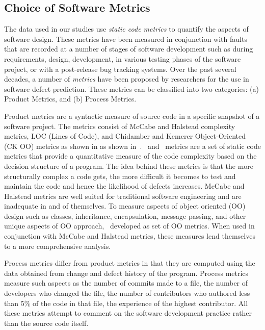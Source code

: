 \subsection{Choice of Software Metrics}
\label{sect:metrics}

The data used in our studies use \textit{static code metrics} to quantify the aspects of software design. These metrics have been measured in conjunction with faults that are recorded at a number of stages of software development such as during requirements, design, development, in various testing phases of the software project, or with a post-release bug tracking systems. Over the past several decades, a number of \textit{metrics} have been proposed by researchers for the use in software defect prediction. These metrics can be classified into two  categories: (a) Product Metrics, and (b) Process Metrics.

Product metrics are a syntactic measure of source code in a specific snapshot of a software project. The metrics consist of McCabe and Halstead complexity metrics, LOC (Lines of Code), and Chidamber and Kemerer Object-Oriented (CK OO) metrics as shown in as shown in~.~\cite{mccabe1976complexity} and~\cite{halstead77} metrics are a set of static code metrics that provide a quantitative measure of the code complexity based on the decision structure of a program. The idea behind these metrics is that the more structurally complex a code gets, the more difficult it becomes to test and maintain the code and hence the likelihood of defects increases. McCabe and Halstead metrics are well suited for traditional software engineering and are inadequate in and of themselves. To measure aspects of object oriented (OO) design such as classes, inheritance, encapsulation, message passing, and other unique aspects of OO approach,~\citep{chidamber1994metrics} developed as set of OO metrics. When used in conjunction with McCabe and Halstead metrics, these measures lend themselves to a more comprehensive analysis.

Process metrics differ from product metrics in that they are computed using the data obtained from change and defect history of the program. Process metrics measure such aspects as the number of commits made to a file, the number of developers who changed the file, the number of contributors who authored less than 5\% of the code in that file, the experience of the highest contributor. All these metrics attempt to comment on the software development practice rather than the source code itself. 

